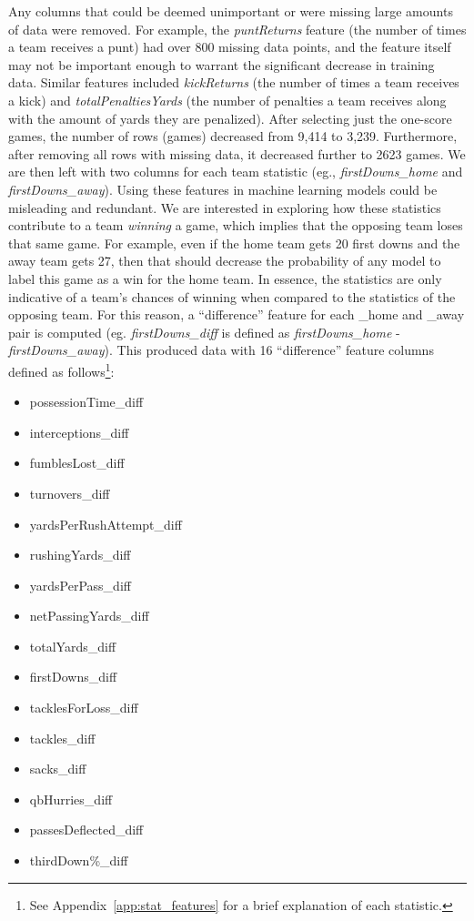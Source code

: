 \documentclass[11pt]{amsart}
\theoremstyle{definition}                  %
\theoremstyle{remark}                       %
\numberwithin{equation}{section}
\begin{document}
Any columns that could be deemed unimportant or were missing large amounts of data were removed. For example, the \textit{puntReturns} feature (the number of times a team receives a punt) had over 800 missing data points, and the feature itself may not be important enough to warrant the significant decrease in training data. Similar features included \textit{kickReturns} (the number of times a team receives a kick) and \textit{totalPenaltiesYards} (the number of penalties a team receives along with the amount of yards they are penalized). After selecting just the one-score games, the number of rows (games) decreased from 9,414 to 3,239. Furthermore, after removing all rows with missing data, it decreased further to 2623 games. We are then left with two columns for each team statistic (eg., \textit{firstDowns\_home} and \textit{firstDowns\_away}). Using these features in machine learning models could be misleading and redundant. We are interested in exploring how these statistics contribute to a team \textit{winning} a game, which implies that the opposing team loses that same game. For example, even if the home team gets 20 first downs and the away team gets 27, then that should decrease the probability of any model to label this game as a win for the home team. In essence, the statistics are only indicative of a team's chances of winning when compared to the statistics of the opposing team. For this reason, a ``difference'' feature for each \_home and \_away pair is computed (eg. \textit{firstDowns\_diff} is defined as \textit{firstDowns\_home} - \textit{firstDowns\_away}). This produced data with 16 ``difference'' feature columns defined as follows\footnote{See Appendix~\ref{app:stat_features} for a brief explanation of each statistic.}:
\begin{itemize}
    \item possessionTime\_diff
    \item interceptions\_diff
    \item fumblesLost\_diff
    \item turnovers\_diff
    \item yardsPerRushAttempt\_diff
    \item rushingYards\_diff
    \item yardsPerPass\_diff
    \item netPassingYards\_diff
    \item totalYards\_diff
    \item firstDowns\_diff
    \item tacklesForLoss\_diff
    \item tackles\_diff
    \item sacks\_diff
    \item qbHurries\_diff
    \item passesDeflected\_diff
    \item thirdDown\%\_diff
\end{itemize}
\end{document}
